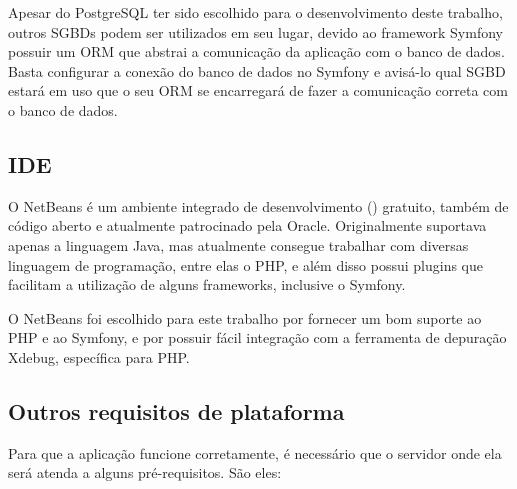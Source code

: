 Apesar do PostgreSQL ter sido escolhido para o desenvolvimento deste trabalho, outros SGBDs
podem ser utilizados em seu lugar, devido ao framework Symfony possuir um ORM que abstrai
a comunicação da aplicação com o banco de dados. Basta configurar a conexão do banco de dados
no Symfony e avisá-lo qual SGBD estará em uso que o seu ORM se encarregará de fazer a comunicação
correta com o banco de dados.

\subsection{IDE}
O NetBeans \cite{netbeans} é um ambiente integrado de desenvolvimento 
() gratuito, também de código aberto e 
atualmente patrocinado pela Oracle. Originalmente suportava apenas a linguagem Java, mas atualmente
consegue trabalhar com diversas linguagem de programação, entre elas o PHP, e além disso possui plugins
que facilitam a utilização de alguns frameworks, inclusive o Symfony.

O NetBeans foi escolhido para este trabalho por fornecer um bom suporte ao PHP e ao Symfony, e por possuir fácil
integração com a ferramenta de depuração Xdebug, específica para PHP.

\subsection{Outros requisitos de plataforma}
Para que a aplicação funcione corretamente, é necessário que o servidor onde ela será 
atenda a alguns pré-requisitos. São eles:

